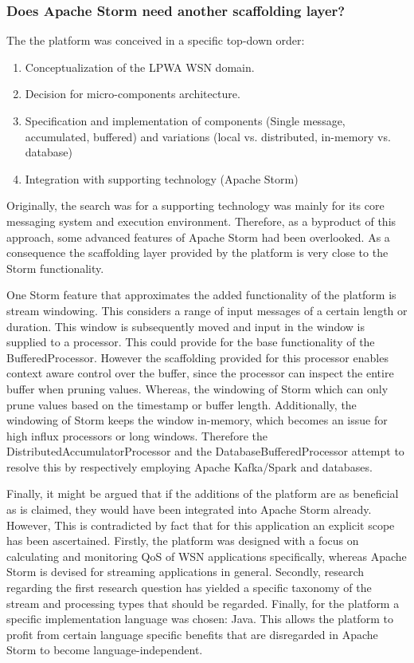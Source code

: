 \subsubsection{Does Apache Storm need another scaffolding layer?}
The the platform was conceived in a specific top-down order:
\begin{enumerate}
\item Conceptualization of the LPWA WSN domain.
\item Decision for micro-components architecture.
\item Specification and implementation of components (Single message, accumulated, buffered) and variations (local vs. distributed, in-memory vs. database)
\item Integration with supporting technology (Apache Storm)
\end{enumerate}
Originally, the search was for a supporting technology was mainly for its core messaging system and execution environment. Therefore, as a byproduct of this approach, some advanced features of Apache Storm had been overlooked. As a consequence the scaffolding layer provided by the platform is very close to the Storm functionality. 

One Storm feature that approximates the added functionality of the platform is stream windowing. This considers a range of input messages of a certain length or duration. This window is subsequently moved and input in the window is supplied to a processor. This could provide for the base functionality of the BufferedProcessor. However the scaffolding provided for this processor enables context aware control over the buffer, since the processor can inspect the entire buffer when pruning values. Whereas, the windowing of Storm which can only prune values based on the timestamp or buffer length. Additionally, the windowing of Storm keeps the window in-memory, which becomes an issue for high influx processors or long windows. Therefore the DistributedAccumulatorProcessor and the DatabaseBufferedProcessor attempt to resolve this by respectively employing Apache Kafka/Spark and databases.

Finally, it might be argued that if the additions of the platform are as beneficial as is claimed, they would have been integrated into Apache Storm already. However, This is contradicted by fact that for this application an explicit scope has been ascertained. Firstly, the platform was designed with a focus on calculating and monitoring QoS of WSN applications specifically, whereas Apache Storm is devised for streaming applications in general. Secondly, research regarding the first research question has yielded a specific taxonomy of the stream and processing types that should be regarded. Finally, for the platform a specific implementation language was chosen: Java. This allows the platform to profit from certain language specific benefits that are disregarded in Apache Storm to become language-independent.
		
